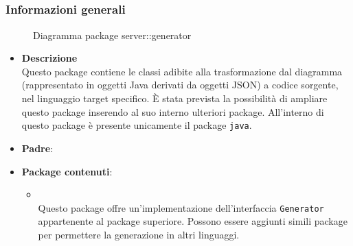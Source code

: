 \subsection{}
\label{\nogloxy{swedesigner::server::generator}}
\subsubsection{Informazioni generali}
\begin{figure}[H]
	\caption{Diagramma package server::generator}
\end{figure}
\begin{itemize}
\item \textbf{Descrizione}\\
Questo package contiene le classi adibite alla trasformazione dal diagramma (rappresentato in oggetti Java derivati da oggetti JSON) a codice sorgente, nel linguaggio target specifico. È stata prevista la possibilità di ampliare questo package inserendo al suo interno ulteriori package. All'interno di questo package è presente unicamente il package \texttt{java}.
\item \textbf{Padre}: \hyperref[\nogloxy{swedesigner::server}]{}
\item \textbf{Package contenuti}:
\begin{itemize}
\item \hyperref[\nogloxy{swedesigner::server::generator::java}]{}\\
Questo package offre un'implementazione dell'interfaccia \texttt{Generator} appartenente al package superiore. Possono essere aggiunti simili package per permettere la generazione in altri linguaggi.
\end{itemize}
\end{itemize}
